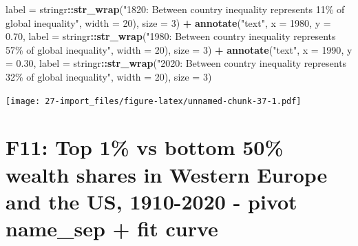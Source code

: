 \documentclass[
  xelatex, ja=standard]{bxjsbook}
\newenvironment{Shaded}{\begin{snugshade}}{\end{snugshade}}
\newcommand{\AttributeTok}[1]{\textcolor[rgb]{0.13,0.29,0.53}{#1}}
\newcommand{\DecValTok}[1]{\textcolor[rgb]{0.00,0.00,0.81}{#1}}
\newcommand{\FloatTok}[1]{\textcolor[rgb]{0.00,0.00,0.81}{#1}}
\newcommand{\FunctionTok}[1]{\textcolor[rgb]{0.13,0.29,0.53}{\textbf{#1}}}
\newcommand{\NormalTok}[1]{#1}
\newcommand{\SpecialCharTok}[1]{\textcolor[rgb]{0.81,0.36,0.00}{\textbf{#1}}}
\newcommand{\StringTok}[1]{\textcolor[rgb]{0.31,0.60,0.02}{#1}}
\theoremstyle{definition}
\theoremstyle{definition}
\theoremstyle{definition}
\theoremstyle{definition}
\theoremstyle{remark}
\begin{document}
\begin{Shaded}
\begin{Highlighting}[]
      \AttributeTok{label =}\NormalTok{ stringr}\SpecialCharTok{::}\FunctionTok{str\_wrap}\NormalTok{(}\StringTok{"1820: Between country inequality represents 11\% }
\StringTok{                                of global inequality"}\NormalTok{, }\AttributeTok{width =} \DecValTok{20}\NormalTok{), }\AttributeTok{size =} \DecValTok{3}\NormalTok{) }\SpecialCharTok{+} 
  \FunctionTok{annotate}\NormalTok{(}\StringTok{"text"}\NormalTok{, }\AttributeTok{x =} \DecValTok{1980}\NormalTok{, }\AttributeTok{y =} \FloatTok{0.70}\NormalTok{, }
      \AttributeTok{label =}\NormalTok{ stringr}\SpecialCharTok{::}\FunctionTok{str\_wrap}\NormalTok{(}\StringTok{"1980: Between country inequality represents 57\% }
\StringTok{                                of global inequality"}\NormalTok{, }\AttributeTok{width =} \DecValTok{20}\NormalTok{), }\AttributeTok{size =} \DecValTok{3}\NormalTok{) }\SpecialCharTok{+}
  \FunctionTok{annotate}\NormalTok{(}\StringTok{"text"}\NormalTok{, }\AttributeTok{x =} \DecValTok{1990}\NormalTok{, }\AttributeTok{y =} \FloatTok{0.30}\NormalTok{, }
      \AttributeTok{label =}\NormalTok{ stringr}\SpecialCharTok{::}\FunctionTok{str\_wrap}\NormalTok{(}\StringTok{"2020: Between country inequality represents 32\% }
\StringTok{                                of global inequality"}\NormalTok{, }\AttributeTok{width =} \DecValTok{20}\NormalTok{), }\AttributeTok{size =} \DecValTok{3}\NormalTok{)}
\end{Highlighting}
\end{Shaded}

\texttt{[image: 27-import\_files/figure-latex/unnamed-chunk-37-1.pdf]}

\hypertarget{f11-top-1-vs-bottom-50-wealth-shares-in-western-europe-and-the-us-1910-2020---pivot-name_sep-fit-curve}{%
\section{F11: Top 1\% vs bottom 50\% wealth shares in Western Europe and the US, 1910-2020 - pivot name\_sep + fit curve}\label{f11-top-1-vs-bottom-50-wealth-shares-in-western-europe-and-the-us-1910-2020---pivot-name_sep-fit-curve}}
\end{document}
